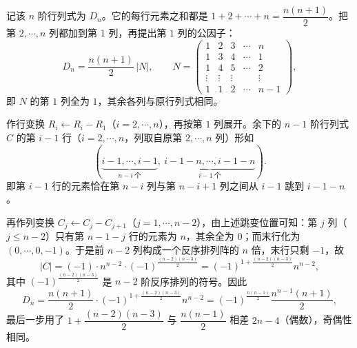 \begin{solution}
记该 $n$ 阶行列式为 $D_n$。它的每行元素之和都是 $1+2+\cdots+n=\dfrac{n(n+1)}{2}$。把第 $2,\cdots,n$ 列都加到第 $1$ 列，再提出第 $1$ 列的公因子：
\[
D_n=\frac{n(n+1)}{2}\,|N|,\qquad
N=\begin{pmatrix}
1&2&3&\cdots&n\\
1&3&4&\cdots&1\\
1&4&5&\cdots&2\\
\vdots&\vdots&\vdots&&\vdots\\
1&1&2&\cdots&n-1
\end{pmatrix},
\]
即 $N$ 的第 $1$ 列全为 $1$，其余各列与原行列式相同。

作行变换 $R_i\leftarrow R_i-R_1$（$i=2,\cdots,n$），再按第 $1$ 列展开。余下的 $n-1$ 阶行列式 $C$ 的第 $i-1$ 行（$i=2,\cdots,n$，列取自原第 $2,\cdots,n$ 列）形如
\[
(\underbrace{i-1,\cdots,i-1}_{n-i\ \text{个}},\ \underbrace{i-1-n,\cdots,i-1-n}_{i-1\ \text{个}}).
\]
即第 $i-1$ 行的元素恰在第 $n-i$ 列与第 $n-i+1$ 列之间从 $i-1$ 跳到 $i-1-n$。

再作列变换 $C_j\leftarrow C_j-C_{j+1}$（$j=1,\cdots,n-2$），由上述跳变位置可知：第 $j$ 列（$j\le n-2$）只有第 $n-1-j$ 行的元素为 $n$，其余全为 $0$；而末行化为 $(0,\cdots,0,-1)$。于是前 $n-2$ 列构成一个反序排列阵的 $n$ 倍，末行只剩 $-1$，故
\[
|C|=(-1)\cdot n^{n-2}\cdot(-1)^{\frac{(n-2)(n-3)}{2}}
=(-1)^{1+\frac{(n-2)(n-3)}{2}}n^{n-2},
\]
其中 $(-1)^{\frac{(n-2)(n-3)}{2}}$ 是 $n-2$ 阶反序排列的符号。因此
\[
D_n=\frac{n(n+1)}{2}\cdot(-1)^{1+\frac{(n-2)(n-3)}{2}}n^{n-2}
=(-1)^{\frac{n(n-1)}{2}}\frac{n^{n-1}(n+1)}{2},
\]
最后一步用了 $1+\dfrac{(n-2)(n-3)}{2}$ 与 $\dfrac{n(n-1)}{2}$ 相差 $2n-4$（偶数），奇偶性相同。
\end{solution}

